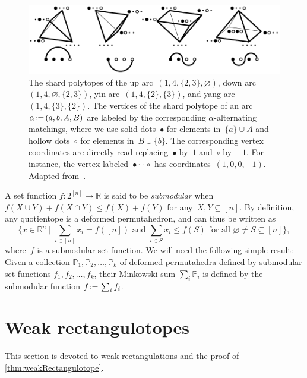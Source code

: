 \documentclass{amsart}
\theoremstyle{definition}
\newcommand{\R}{\mathbb{R}} %
\newcommand{\Bigset}[2]{\Big\{ #1 \;\Big|\; #2 \Big\}} %
\newcommand{\eqdef}{\mbox{\,\raisebox{0.2ex}{\scriptsize\ensuremath{\mathrm:}}\ensuremath{=}\,}} %
\newcommand{\darkblue}{\color{darkblue}} %
\newcommand{\defn}[1]{\textsl{\darkblue #1}} %
\newcommand{\polytope}[1]{\mathds{#1}} %
\begin{document}
\begin{figure}
	\capstart
	\centerline{\includegraphics[scale=1]{shardPolytopes}}
	\caption{The shard polytopes of the up arc~$(1, 4, \{2, 3\}, \varnothing)$, down arc~$(1, 4, \varnothing, \{2, 3\})$, yin arc~$(1, 4, \{2\}, \{3\})$, and yang arc~$(1, 4, \{3\}, \{2\})$. The vertices of the shard polytope of an arc~$\alpha \eqdef (a, b, A, B)$ are labeled by the corresponding $\alpha$-alternating matchings, where we use solid dots~$\bullet$ for elements in~$\{a\} \cup A$ and hollow dots~$\circ$ for elements in~$B \cup \{b\}$. The corresponding vertex coordinates are directly read replacing~$\bullet$ by~$1$ and~$\circ$ by~$-1$. For instance, the vertex labeled~${\bullet \cdot \cdot \,\circ}$ has coordinates~$(1,0,0,-1)$. Adapted from~\cite[Fig.~10]{MR4584712}.}
	\label{fig:shardPolytopes}
\end{figure}

A set function $f:2^{[n]}\mapsto \R$ is said to be \defn{submodular} when $f(X \cup Y) + f(X \cap Y) \le f(X) + f(Y)$ for any~$X, Y \subseteq [n]$.
By definition, any quotientope is a deformed permutahedron, and can thus be written as
  \[
  \Bigset{x \in \R^n}{ \sum_{i \in [n]} x_i = f([n]) \text{ and } \sum_{i \in S} x_i \le f(S) \text{ for all } \varnothing \ne S \subseteq [n]},
  \]
where~$f$ is a submodular set function.
We will need the following simple result: Given a collection $\polytope{P}_1, \polytope{P}_2,\ldots ,\polytope{P}_k$ of deformed permutahedra defined by submodular set functions $f_1,f_2,\ldots ,f_k$, their Minkowski sum $\sum_i \polytope{P}_i$ is defined by the submodular function $f \eqdef \sum_i f_i$.


\pagebreak
\section{Weak rectangulotopes}
\label{sec:weakRectangulotopes}

This section is devoted to weak rectangulations and the proof of \cref{thm:weakRectangulotope}.
\end{document}
